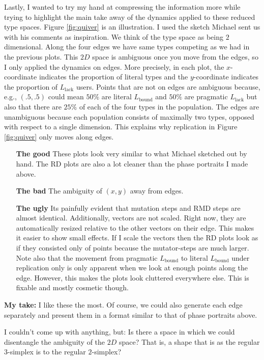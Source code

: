\documentclass[fleqn,reqno,10pt]{article}
\newcommand{\mylang}[1]{\ensuremath{L_{\text{#1}}}\xspace} %
\newcommand{\Lbound}{\mylang{bound}}
\newcommand{\Llack}{\mylang{lack}}
\begin{document}
Lastly, I wanted to try my hand at compressing the information more while trying to highlight the main take away of the dynamics applied to these reduced type spaces. Figure \ref{fig:quiver} is an illustration. I used the sketch Michael sent us with his comments as inspiration. We think of the type space as being $2$ dimensional. Along the four edges we have same types competing as we had in the previous plots. This $2D$ space is ambiguous once you move from the edges, so I only applied the dynamics on edges. More precisely, in each plot, the $x$-coordinate indicates the proportion of literal types and the $y$-coordinate indicates the proportion of $\Llack$ users. Points that are not on edges are ambiguous because, e.g., $(.5,.5)$ could mean $50\%$ are literal $\Lbound$ and $50\%$ are pragmatic $\Llack$ but also that there are $25\%$ of each of the four types in the population. The edges are unambiguous because each population consists of maximally two types, opposed with respect to a single dimension. This explains why replication in Figure \ref{fig:quiver} only moves along edges.

\begin{itemize}
\item[{\bf The good}] These plots look very similar to what Michael sketched out by hand. The RD plots are also a lot cleaner than the phase portraits I made above.
\item[{\bf The bad}] The ambiguity of $(x,y)$ away from edges.
\item[{\bf The ugly}] Its painfully evident that mutation steps and RMD steps are almost identical. Additionally, vectors are not scaled. Right now, they are automatically resized relative to the other vectors on their edge. This makes it easier to show small effects. If I scale the vectors then the RD plots look as if they consisted only of points because the mutator-steps are much larger. Note also that the movement from pragmatic $\Lbound$ to literal $\Lbound$ under replication only is only apparent when we look at enough points along the edge. However, this makes the plots look cluttered everywhere else. This is fixable and mostly cosmetic though.
\end{itemize}
{\bf My take:} I like these the most. Of course, we could also generate each edge separately and present them in a format similar to that of phase portraits above. 

I couldn't come up with anything, but: Is there a space in which we could disentangle the ambiguity of the $2D$ space? That is, a shape that is as the regular $3$-simplex is to the regular $2$-simplex?
\end{document}
